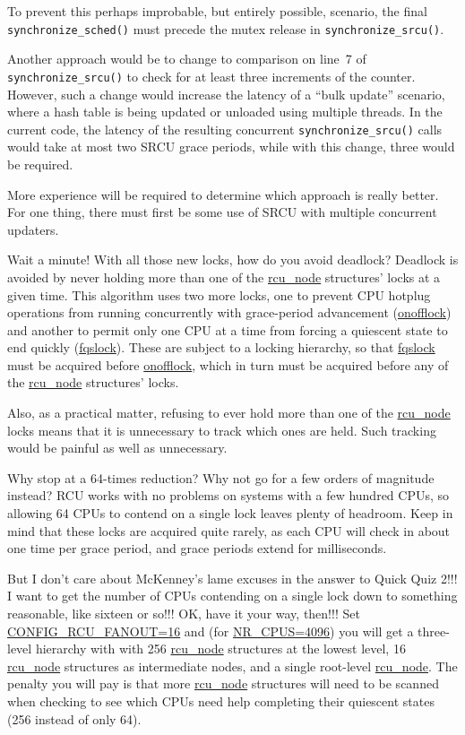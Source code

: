 	To prevent this perhaps improbable, but entirely possible,
	scenario, the final {\tt synchronize\_sched()} must precede
	the mutex release in {\tt synchronize\_srcu()}.

	Another approach would be to change to comparison on
	line~7 of {\tt synchronize\_srcu()} to check for at
	least three increments of the counter.
	However, such a change would increase the latency of a
	``bulk update'' scenario, where a hash table is being updated
	or unloaded using multiple threads.
	In the current code, the latency of the resulting concurrent
	{\tt synchronize\_srcu()} calls would take at most two SRCU
	grace periods, while with this change, three would be required.

	More experience will be required to determine which approach
	is really better.
	For one thing, there must first be some use of SRCU with
	multiple concurrent updaters.

\QuickQ{}
	Wait a minute!
	With all those new locks, how do you avoid deadlock?
\QuickA{}
	Deadlock is avoided by never holding more than one of the
	\url{rcu_node} structures' locks at a given time.
	This algorithm uses two more locks, one to prevent CPU hotplug
	operations from running concurrently with grace-period advancement
	(\url{onofflock}) and another
	to permit only one CPU at a time from forcing a quiescent state
	to end quickly (\url{fqslock}).
	These are subject to a locking hierarchy, so that
	\url{fqslock} must be acquired before
	\url{onofflock}, which in turn must be acquired before
	any of the \url{rcu_node} structures' locks.

	Also, as a practical matter, refusing to ever hold more than
	one of the \url{rcu_node} locks means that it is unnecessary
	to track which ones are held.
	Such tracking would be painful as well as unnecessary.

\QuickQ{}
	Why stop at a 64-times reduction?
	Why not go for a few orders of magnitude instead?
\QuickA{}
	RCU works with no problems on
	systems with a few hundred CPUs, so allowing 64 CPUs to contend on
	a single lock leaves plenty of headroom.
	Keep in mind that these locks are acquired quite rarely, as each
	CPU will check in about one time per grace period, and grace periods
	extend for milliseconds.

\QuickQ{}
	But I don't care about McKenney's lame excuses in the answer to
	Quick Quiz 2!!!
	I want to get the number of CPUs contending on a single lock down
	to something reasonable, like sixteen or so!!!
\QuickA{}
	OK, have it your way, then!!!
	Set \url{CONFIG_RCU_FANOUT=16} and (for \url{NR_CPUS=4096})
	you will get a
	three-level hierarchy with with 256 \url{rcu_node} structures
	at the lowest level, 16 \url{rcu_node} structures as intermediate
	nodes, and a single root-level \url{rcu_node}.
	The penalty you will pay is that more \url{rcu_node} structures
	will need to be scanned when checking to see which CPUs need help
	completing their quiescent states (256 instead of only 64).

